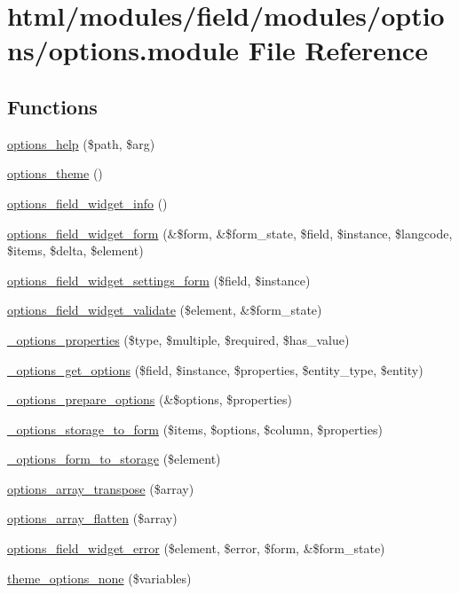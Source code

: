 \hypertarget{options_8module}{
\section{html/modules/field/modules/options/options.module File Reference}
\label{options_8module}
}
\subsection*{Functions}
\begin{DoxyCompactItemize}
\item 
\hyperlink{options_8module_af1fe641e7ce3d6b9b177b6b0b6d9f79c}{options\_\-help} (\$path, \$arg)
\item 
\hyperlink{options_8module_abd79ab0dcf6dd76002d3907c7c6b23aa}{options\_\-theme} ()
\item 
\hyperlink{options_8module_a2a5b985f8f891674657082a64718a2f3}{options\_\-field\_\-widget\_\-info} ()
\item 
\hyperlink{options_8module_a3b29c0fa799d570fc011b1b45e34719f}{options\_\-field\_\-widget\_\-form} (\&\$form, \&\$form\_\-state, \$field, \$instance, \$langcode, \$items, \$delta, \$element)
\item 
\hyperlink{options_8module_a9be7905a9c57a7ce26a8c37dc441b446}{options\_\-field\_\-widget\_\-settings\_\-form} (\$field, \$instance)
\item 
\hyperlink{options_8module_a7d411a2659add08a965e0892fe83787f}{options\_\-field\_\-widget\_\-validate} (\$element, \&\$form\_\-state)
\item 
\hyperlink{options_8module_a77844a0b5beb19eaa6a58ba1213150e5}{\_\-options\_\-properties} (\$type, \$multiple, \$required, \$has\_\-value)
\item 
\hyperlink{options_8module_a31c60c79de94e0ade1abf9b53e05b695}{\_\-options\_\-get\_\-options} (\$field, \$instance, \$properties, \$entity\_\-type, \$entity)
\item 
\hyperlink{options_8module_ab54ed362b7302ba52cd93457c315aec8}{\_\-options\_\-prepare\_\-options} (\&\$options, \$properties)
\item 
\hyperlink{options_8module_a2685060524ba869cbf096e798a374070}{\_\-options\_\-storage\_\-to\_\-form} (\$items, \$options, \$column, \$properties)
\item 
\hyperlink{options_8module_aac475d38301c8589cc2e903b7c2920c3}{\_\-options\_\-form\_\-to\_\-storage} (\$element)
\item 
\hyperlink{options_8module_ad8c45e3075cbf026b5838474c28a9dc0}{options\_\-array\_\-transpose} (\$array)
\item 
\hyperlink{options_8module_aae0e4ab472c2c47597c915b106c6faf3}{options\_\-array\_\-flatten} (\$array)
\item 
\hyperlink{options_8module_a1027f9d62824a05b68ad460e23a5edcf}{options\_\-field\_\-widget\_\-error} (\$element, \$error, \$form, \&\$form\_\-state)
\item 
\hyperlink{group__themeable_gac1e1ed5c70484046a550344155a9bf6d}{theme\_\-options\_\-none} (\$variables)
\end{DoxyCompactItemize}


